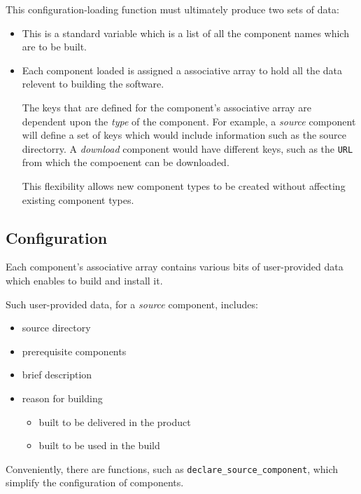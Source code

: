 This configuration-loading function must ultimately produce two sets
of data:

\begin{itemize}
\item \lmsbwcomponents

  This is a standard \gnumake variable which is a list of all
  the component names which are to be built.

\item {}

  Each component loaded is assigned a \gmsl associative array to
  hold all the data relevent to building the software.

  The keys that are defined for the component's associative array are
  dependent upon the \emph{type} of the component.  For example, a
  \emph{source} component will define a set of keys which would
  include information such as the source directorry.  A
  \emph{download} component would have different keys, such as the
  \texttt{URL} from which the compoenent can be downloaded.

  This flexibility allows new component types to be created without
  affecting existing component types.
\end{itemize}


\subsection{ Configuration}

Each component's associative array contains various bits of
user-provided data which enables \lmsbw to build and install it.

Such user-provided data, for a \emph{source} component, includes:

\begin{itemize}
\item source directory
\item prerequisite components
\item brief description
\item reason for building
  \begin{itemize}
  \item built to be delivered in the product
  \item built to be used in the build
  \end{itemize}
\end{itemize}

Conveniently, there are \lmsbw functions, such as
\texttt{declare\_source\_component}, which simplify the configuration
of components.


